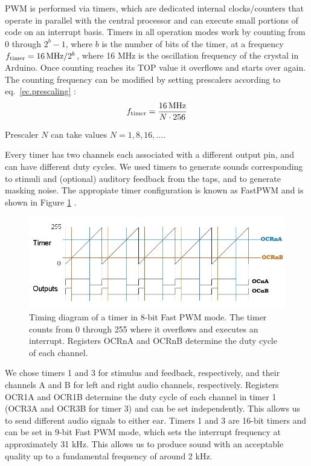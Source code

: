 \documentclass[twocolumn]{article}
\begin{document}
PWM is performed via timers, which are dedicated internal clocks/counters that operate in parallel with the central processor and can execute small portions of code on an interrupt basis. Timers in all operation modes work by counting from 0 through $2^b-1$, where $b$ is the number of bits of the timer, at a frequency $f_{\mbox{\scriptsize timer}} = 16\,\mbox{MHz}/2^b$, where 16 MHz is the oscillation frequency of the crystal in Arduino. Once counting reaches its TOP value it overflows and starts over again. The counting frequency can be modified by setting prescalers according to eq.\ \ref{ec.prescaling} \cite{arduinomanual}:
\begin{equation}
    f_{\mbox{\scriptsize timer}} = \frac{16\,\mbox{MHz}}{N \cdot 256}
    \label{ec.prescaling}
\end{equation}

\noindent Prescaler $N$ can take values $N=1,8,16,\dots$.

Every timer has two channels each associated with a different output pin, and can have different duty cycles. We used timers to generate sounds corresponding to stimuli and (optional) auditory feedback from the taps, and to generate masking noise. The appropiate timer configuration is known as FastPWM and is shown in Figure \ref{fig.FastPWM} \cite{TimersOVF}.

\begin{figure}[ht]
    \centering
    \includegraphics[width=\linewidth]{figures/FastPWM_cb.jpg}
    \caption{Timing diagram of a timer in 8-bit Fast PWM mode. The timer counts from 0 through 255 where it overflows and executes an interrupt. Registers OCRnA and OCRnB determine the duty cycle of each channel.}
    \label{fig.FastPWM}
\end{figure}

We chose timers 1 and 3 for stimulus and feedback, respectively, and their channels A and B for left and right audio channels, respectively. Registers OCR1A and OCR1B determine the duty cycle of each channel in timer 1 (OCR3A and OCR3B for timer 3) and can be set independently. This allows us to send different audio signals to either ear. Timers 1 and 3 are 16-bit timers and can be set in 9-bit Fast PWM mode, which sets the interrupt frequency at approximately 31 kHz. This allows us to produce sound with an acceptable quality up to a fundamental frequency of around 2 kHz.
\end{document}
